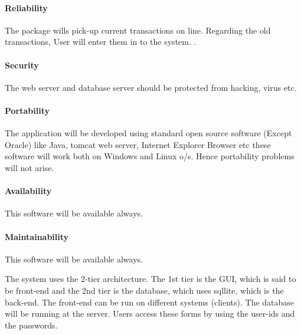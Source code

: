 \paragraph{Reliability }
\begin{enumerate}
The package wills pick-up current transactions on line. Regarding the old transactions, User will enter them in to the system. .\\
\end{enumerate}

\paragraph{Security }
\begin{enumerate}
The web server and database server should be protected from hacking, virus etc.\\
\end{enumerate}


\paragraph{Portability }
\begin{enumerate}
The application will be developed using standard open source software (Except Oracle) like Java, tomcat web server, Internet Explorer Browser etc these software will work both on Windows and Linux o/s.  Hence portability problems will not arise.\\
\end{enumerate}

\paragraph{Availability }
\begin{enumerate}
 This software will be available always.\\
\end{enumerate}

\paragraph{Maintainability  }
\begin{enumerate}
 This software will be available always.\\
\end{enumerate}
The system uses the 2-tier architecture. The 1st tier is the GUI, which is said to be front-end and the 2nd tier is the database, which uses sqllite, which is the back-end.   
The front-end can be run on different systems (clients). The database will be running at the server. Users access these forms by using the user-ids and the passwords.\\

